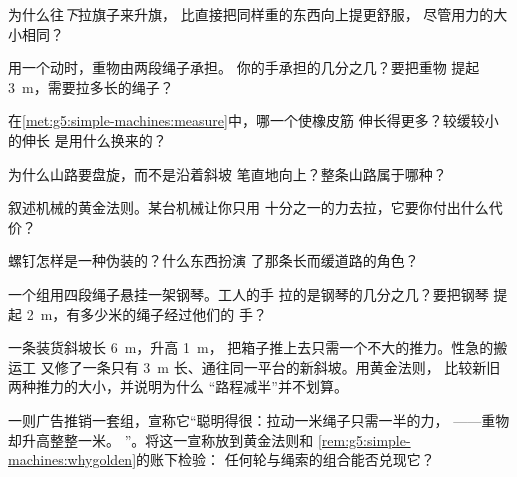 \begin{exercise}[$\star$]\label{exo:g5:simple-machines:3}
为什么往\emph{下}拉旗子来升旗，
比直接把同样重的东西向上提更舒服，
尽管用力的大小相同？
\end{exercise}

\begin{exercise}[$\star$]\label{exo:g5:simple-machines:4}
用一个动时，重物由两段绳子承担。
你的手承担的几分之几？要把重物
提起 \qty{3}{m}，需要拉多长的绳子？
\end{exercise}

\begin{exercise}[$\star$]\label{exo:g5:simple-machines:5}
在\cref{met:g5:simple-machines:measure}中，哪一个使橡皮筋
伸长得更多？较缓较小的伸长
是用什么换来的？
\end{exercise}

\begin{exercise}[$\star$]\label{exo:g5:simple-machines:6}
为什么山路要盘旋，而不是沿着斜坡
笔直地向上？整条山路属于哪种？
\end{exercise}

\begin{exercise}[$\star$]\label{exo:g5:simple-machines:7}
叙述机械的黄金法则。某台机械让你只用
十分之一的力去拉，它要你付出什么代价？
\end{exercise}

\begin{exercise}[$\star$]\label{exo:g5:simple-machines:8}
螺钉怎样是一种伪装的？什么东西扮演
了那条长而缓道路的角色？
\end{exercise}

\begin{exercise}[$\star\star$]\label{exo:g5:simple-machines:9}
一个组用四段绳子悬挂一架钢琴。工人的手
拉的是钢琴的几分之几？要把钢琴
提起 \qty{2}{m}，有多少米的绳子经过他们的
手？
\end{exercise}

\begin{exercise}[$\star\star$]\label{exo:g5:simple-machines:10}
一条装货斜坡长 \qty{6}{m}，升高 \qty{1}{m}，
把箱子推上去只需一个不大的推力。性急的搬运工
又修了一条只有 \qty{3}{m} 长、通往同一平台的新斜坡。用黄金法则，
比较新旧两种推力的大小，并说明为什么
“路程减半”并不划算。
\end{exercise}

\begin{exercise}[$\star\star$]\label{exo:g5:simple-machines:11}
一则广告推销一套组，宣称它“聪明得很：拉动一米绳子只需一半的力，
——重物却升高整整一米。
”。将这一宣称放到黄金法则和
\cref{rem:g5:simple-machines:whygolden}的账下检验：
任何轮与绳索的组合能否兑现它？
\end{exercise}
